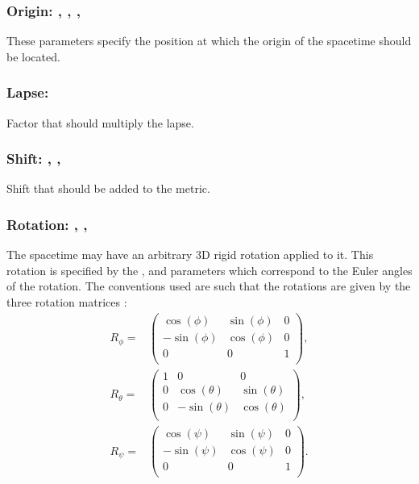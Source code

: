 \documentclass{article}
\begin{document}
\subsubsection{Origin: , , , }
These parameters specify the position at which the origin of the spacetime
should be located.

\subsubsection{Lapse: }
Factor that should multiply the lapse.

\subsubsection{Shift: , , }
Shift that should be added to the metric.

\subsubsection{Rotation: , , }
The spacetime may have an arbitrary $3$D rigid rotation applied to it. This
rotation is specified by the ,  and  parameters
which correspond to the Euler angles of the rotation. The conventions used are
such that the rotations are given by the three rotation matrices \cite{EinsteinExact_Euler}:
\begin{align}
R_\phi =& 
\left(
\begin{array}{ccc}
 \cos (\phi ) & \sin (\phi ) & 0 \\
 -\sin (\phi ) & \cos (\phi ) & 0 \\
 0 & 0 & 1 \\
\end{array}
\right), \nonumber \\
R_\theta =&
\left(
\begin{array}{ccc}
 1 & 0 & 0 \\
 0 & \cos (\theta ) & \sin (\theta ) \\
 0 & -\sin (\theta ) & \cos (\theta ) \\
\end{array}
\right), \nonumber \\
R_\psi =&
\left(
\begin{array}{ccc}
 \cos (\psi ) & \sin (\psi ) & 0 \\
 -\sin (\psi ) & \cos (\psi ) & 0 \\
 0 & 0 & 1 \\
\end{array}
\right).
\end{align}
\end{document}
